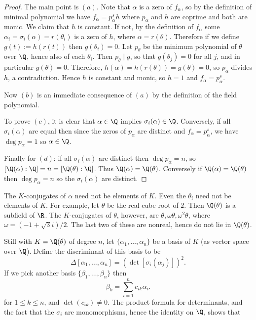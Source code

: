 \begin{proof}
The main point is $(a)$. Note that $\alpha$ is a zero of $f_\alpha$, so by the definition of minimal polynomial we have $f_\alpha=p_\alpha^sh$ where $p_\alpha$ and $h$ are coprime and both are monic. We claim that $h$ is constant. If not, by the definition of $f_\alpha$ some $\alpha_i=\sigma_i(\alpha)=r(\theta_i)$ is a zero of $h$, where $\alpha=r(\theta)$. Therefore if we define $g(t):=h(r(t))$ then $g(\theta_i)=0$. Let $p_\theta$ be the minimum polynomial of $\theta$ over $\Q$, hence also of each $\theta_i$. Then $p_\theta\mid g$, so that $g(\theta_j)=0$ for all $j$, and in particular $g(\theta)=0$. Therefore, $h(\alpha)=h(r(\theta))=g(\theta)=0$, so $p_\alpha$ divides $h$, a contradiction. Hence $h$ is constant and monic, so $h=1$ and $f_\alpha=p_\alpha^s$.\par
Now $(b)$ is an immediate consequence of $(a)$ by the definition of the field
polynomial.\par
To prove $(c)$, it is clear that $\alpha\in\Q$ implies $\sigma_i(\alpha)\in\Q$. Conversely, if all $\sigma_i(\alpha)$ are equal then since the zeros of $p_\alpha$ are distinct and $f_\alpha=p_\alpha^s$, we have $\deg p_\alpha=1$ so $\alpha\in\Q$.\par
Finally for $(d)$: if all $\sigma_i(\alpha)$ are distinct then $\deg p_\alpha=n$, so $[\Q(\alpha):\Q]=n=[\Q(\theta):\Q]$. Thus $\Q(\alpha)=\Q(\theta)$. Conversely if $\Q(\alpha)=\Q(\theta)$ then $\deg p_\alpha=n$ so the $\sigma_i(\alpha)$ are distinct.
\end{proof}
\begin{remark}
The $K$-conjugates of $\alpha$ need not be elements of $K$. Even the $\theta_i$ need not be elements of $K$. For example, let $\theta$ be the real cube root of $2$. Then $\Q(\theta)$ is a subfield of $\R$. The $K$-conjugates of $\theta$, however, are $\theta,\omega\theta,\omega^2\theta$, where $\omega=(-1+\sqrt{3}i)/2$. The last two of these are nonreal, hence do not lie in $\Q(\theta)$.
\end{remark}
Still with $K=\Q(\theta)$ of degree $n$, let $\{\alpha_1,\dots,\alpha_n\}$ be a basis of $K$ (as vector space over $\Q$). Define the discriminant of this basis to be
\[\Delta[\alpha_1,\dots,\alpha_n]=(\det[\sigma_i(\alpha_j)])^2.\]
If we pick another basis $\{\beta_1,\dots,\beta_n\}$ then
\[\beta_k=\sum_{i=1}^{n}c_{ik}\alpha_i.\]
for $1\leq k\leq n$, and $\det(c_{ik})\neq 0$. The product formula for determinants, and the fact that the $\sigma_i$ are monomorphisms, hence the identity on $\Q$, shows that
